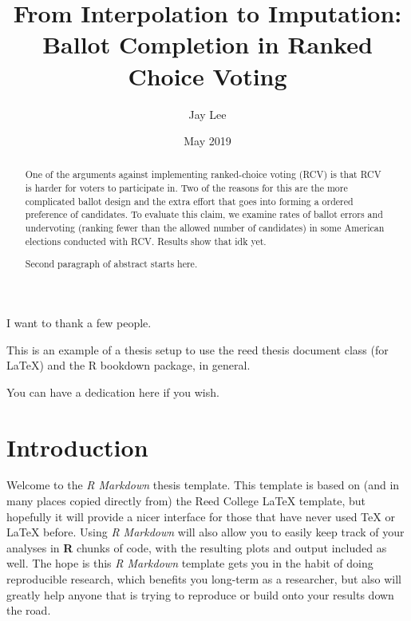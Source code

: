 \documentclass[12pt,twoside]{reedthesis}
\title{From Interpolation to Imputation: Ballot Completion in Ranked Choice
Voting}
\author{Jay Lee}
\date{May 2019}
\theoremstyle{definition}
\theoremstyle{definition}
\theoremstyle{definition}
\theoremstyle{remark}
\begin{document}
  \maketitle

\frontmatter %
\pagestyle{empty} %
  \begin{acknowledgements}
    I want to thank a few people.
  \end{acknowledgements}
  \begin{preface}
    This is an example of a thesis setup to use the reed thesis document
    class (for LaTeX) and the R bookdown package, in general.
  \end{preface}
  \hypersetup{linkcolor=black}
  \setcounter{tocdepth}{2}
  \tableofcontents

  \listoftables

  \listoffigures
  \begin{abstract}
    One of the arguments against implementing ranked-choice voting (RCV) is
    that RCV is harder for voters to participate in. Two of the reasons for
    this are the more complicated ballot design and the extra effort that
    goes into forming a ordered preference of candidates. To evaluate this
    claim, we examine rates of ballot errors and undervoting (ranking fewer
    than the allowed number of candidates) in some American elections
    conducted with RCV. Results show that idk yet.
    
    \par
    
    Second paragraph of abstract starts here.
  \end{abstract}
  \begin{dedication}
    You can have a dedication here if you wish.
  \end{dedication}
\mainmatter %
\pagestyle{fancyplain} %

\hypertarget{introduction}{%
\chapter*{Introduction}\label{introduction}}

Welcome to the \emph{R Markdown} thesis template. This template is based
on (and in many places copied directly from) the Reed College LaTeX
template, but hopefully it will provide a nicer interface for those that
have never used TeX or LaTeX before. Using \emph{R Markdown} will also
allow you to easily keep track of your analyses in \textbf{R} chunks of
code, with the resulting plots and output included as well. The hope is
this \emph{R Markdown} template gets you in the habit of doing
reproducible research, which benefits you long-term as a researcher, but
also will greatly help anyone that is trying to reproduce or build onto
your results down the road.
\end{document}
